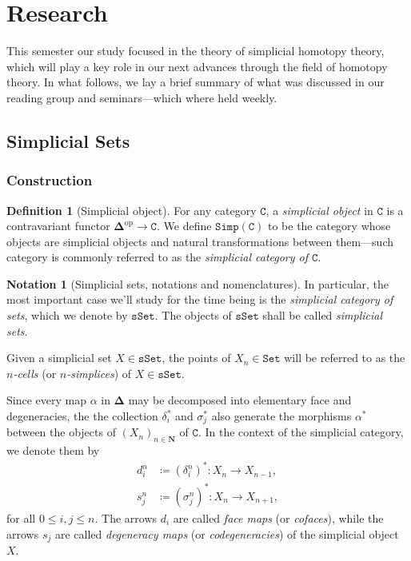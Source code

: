 \documentclass[11pt, reqno]{amsart}
\theoremstyle{definition}
\newtheorem{definition}[theorem]{Definition}
\newtheorem{notation}[theorem]{Notation}
\renewcommand{\leq}{\leqslant}
\newcommand{\N}{\mathbf{N}}
\newcommand{\cat}{\texttt}
\newcommand{\catfont}{\texttt}
\newcommand{\op}{\mathrm{op}}
\newcommand{\Set}{{\catfont{Set}}}          %
\newcommand{\Splx}{{\mathbf{\Delta}}}           %
\newcommand{\sSet}{{\catfont{sSet}}}            %
\newcommand{\Simp}[1]{{\catfont{Simp}(#1)}}     %
\begin{document}
\section{Research}

This semester our study focused in the theory of simplicial homotopy theory,
which will play a key role in our next advances through the field of homotopy
theory. In what follows, we lay a brief summary of what was discussed in our
reading group and seminars---which where held weekly.

\subsection{Simplicial Sets}

\subsubsection{Construction}

\begin{definition}[Simplicial object]
\label{def:simplicial-object}
For any category \(\cat C\), a \emph{simplicial object} in \(\cat C\) is a
contravariant functor \(\Splx^{\op} \to \cat C\). We define \(\Simp{\cat C}\) to
be the category whose objects are simplicial objects and natural transformations
between them---such category is commonly referred to as the \emph{simplicial
  category of \(\cat C\)}.
\end{definition}

\begin{notation}[Simplicial sets, notations and nomenclatures]
\label{not:simplicial-sets-notation-and-nomenclature}
In particular, the most important case we'll study for the time being is the
\emph{simplicial category of sets}, which we denote by \(\sSet\). The objects of
\(\sSet\) shall be called \emph{simplicial sets}.\

Given a simplicial set \(X \in \sSet\), the points of \(X_n \in \Set\) will be
referred to as the \emph{\(n\)-cells} (or \emph{\(n\)-simplices}) of
\(X \in \sSet\).
\end{notation}

Since every map \(\alpha\) in \(\Splx\) may be decomposed into elementary face
and degeneracies, the the collection \(\delta_i^{*}\) and \(\sigma_j^{*}\) also
generate the morphisms \(\alpha^{*}\) between the objects of
\((X_n)_{n \in \N}\) of \(\cat C\). In the context of the simplicial category,
we denote them by
\begin{align*}
  d_i^n &\coloneq (\delta_i^n)^{*}: X_n \longrightarrow X_{n-1}, \\
  s_j^n &\coloneq (\sigma_j^n)^{*}: X_n \longrightarrow X_{n+1},
\end{align*}
for all \(0 \leq i, j \leq n\). The arrows \(d_i\) are called \emph{face maps}
(or \emph{cofaces}), while the arrows \(s_j\) are called \emph{degeneracy maps}
(or \emph{codegeneracies}) of the simplicial object \(X\).
\end{document}
